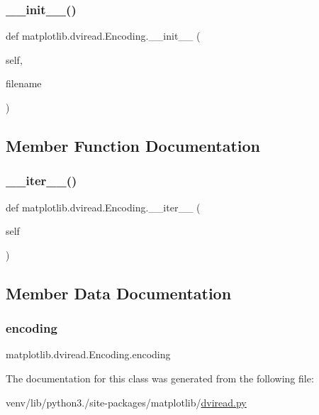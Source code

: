 \subsubsection{\texorpdfstring{\+\_\+\+\_\+init\+\_\+\+\_\+()}{\_\_init\_\_()}}
{\footnotesize\ttfamily def matplotlib.\+dviread.\+Encoding.\+\_\+\+\_\+init\+\_\+\+\_\+ (\begin{DoxyParamCaption}\item[{}]{self,  }\item[{}]{filename }\end{DoxyParamCaption})}



\subsection{Member Function Documentation}
\mbox{\label{classmatplotlib_1_1dviread_1_1Encoding_a52525e75c6870ef2cb7a5200dc98e1c8}} 
\subsubsection{\texorpdfstring{\+\_\+\+\_\+iter\+\_\+\+\_\+()}{\_\_iter\_\_()}}
{\footnotesize\ttfamily def matplotlib.\+dviread.\+Encoding.\+\_\+\+\_\+iter\+\_\+\+\_\+ (\begin{DoxyParamCaption}\item[{}]{self }\end{DoxyParamCaption})}



\subsection{Member Data Documentation}
\mbox{\label{classmatplotlib_1_1dviread_1_1Encoding_aa4f3d3a5d8b24c7de2ddaadcbdeb4e6f}} 
\subsubsection{\texorpdfstring{encoding}{encoding}}
{\footnotesize\ttfamily matplotlib.\+dviread.\+Encoding.\+encoding}



The documentation for this class was generated from the following file\+:\begin{DoxyCompactItemize}
\item 
venv/lib/python3./site-\/packages/matplotlib/\hyperlink{dviread_8py}{dviread.\+py}\end{DoxyCompactItemize}
